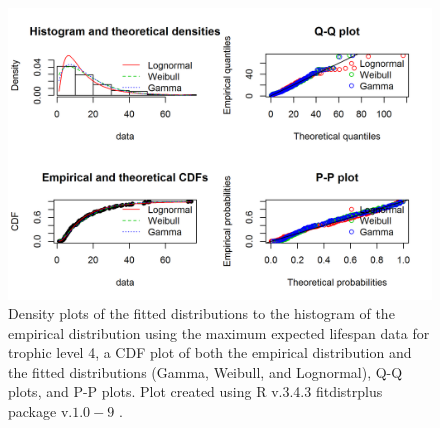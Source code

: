 \documentclass[oneside,12pt,final]{sty/ucthesis-CA2012}
\let\cite\citep                             %
\begin{document}
\begin{mainmatter}
\begin{figure}[H]
     \centering
       \includegraphics[width=.8\textwidth]{fig/gof_l4}
    \caption{Density plots of the fitted distributions to the histogram of the empirical distribution using the maximum expected lifespan data for trophic level 4, a CDF plot of both the empirical distribution and the fitted distributions (Gamma, Weibull, and Lognormal), Q-Q plots, and P-P plots. Plot created using R v.3.4.3 \cite{Rcite} fitdistrplus package v.$1.0-9$ \cite{fitdistrplus}. }
    \label{gof_l4_a3}
\end{figure}


\end{mainmatter}
\end{document}
